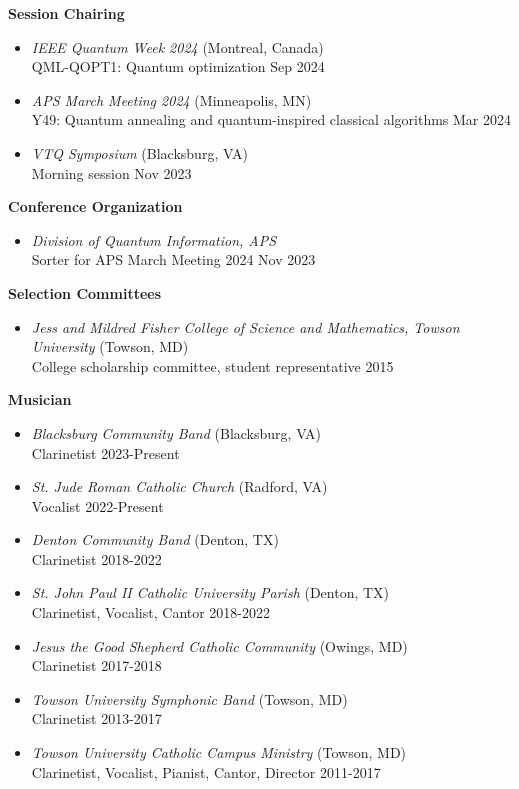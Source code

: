 \documentclass[marginmode, 10pt]{res} %
\begin{document}
\begin{resume}
\textbf{Session Chairing}
\begin{itemize}
    \item \textit{IEEE Quantum Week 2024} (Montreal, Canada) \\
    QML-QOPT1: Quantum optimization \hfill Sep 2024
    \item \textit{APS March Meeting 2024} (Minneapolis, MN) \\
    Y49: Quantum annealing and quantum-inspired classical algorithms \hfill Mar 2024
    \item \textit{VTQ Symposium} (Blacksburg, VA) \\
    Morning session \hfill Nov 2023
\end{itemize}

\textbf{Conference Organization}
\begin{itemize}
    \item \textit{Division of Quantum Information, APS} \\
    Sorter for APS March Meeting 2024 \hfill Nov 2023
\end{itemize}

\textbf{Selection Committees}
\begin{itemize}
    \item \textit{Jess and Mildred Fisher College of Science and Mathematics, Towson University} (Towson, MD) \\
    College scholarship committee, student representative \hfill 2015
\end{itemize}

\textbf{Musician}
\begin{itemize}
    \item \textit{Blacksburg Community Band} (Blacksburg, VA) \\
    Clarinetist \hfill 2023-Present
    \item \textit{St. Jude Roman Catholic Church} (Radford, VA) \\
    Vocalist \hfill 2022-Present
    \item \textit{Denton Community Band} (Denton, TX) \\
    Clarinetist \hfill 2018-2022
    \item \textit{St. John Paul II Catholic University Parish} (Denton, TX) \\
    Clarinetist, Vocalist, Cantor \hfill 2018-2022
    \item \textit{Jesus the Good Shepherd Catholic Community} (Owings, MD) \\
    Clarinetist \hfill 2017-2018
    \item \textit{Towson University Symphonic Band} (Towson, MD) \\
    Clarinetist \hfill 2013-2017
    \item \textit{Towson University Catholic Campus Ministry} (Towson, MD) \\
    Clarinetist, Vocalist, Pianist, Cantor, Director \hfill 2011-2017
\end{itemize}




\end{resume}
\end{document}
